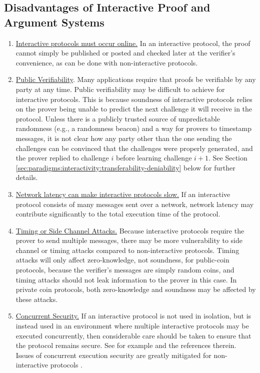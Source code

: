 \subsection{Disadvantages of Interactive Proof and Argument Systems}
\label{sec:paradigms:interactivity:disadvantages}
\begin{enumerate}

\item \underline{Interactive protocols must occur online.} In an interactive protocol, the proof cannot simply be published or posted and checked later at the verifier's convenience, as can be done with non-interactive protocols.

\item \underline{Public Verifiability}. Many applications require that proofs be verifiable by any party at any time. 
Public verifiability
may be difficult to achieve for interactive protocols. This is because soundness of interactive 
protocols relies on the prover being unable to predict the next challenge it will receive in the protocol. Unless there is a publicly trusted source of unpredictable
randomness (e.g., a randomness beacon) and a way for provers to timestamp messages, it is not clear how any party other than
the one sending the challenges can be convinced that the challenges were properly generated, and the prover replied to challenge $i$ before learning challenge $i+1$.
See Section \ref{sec:paradigms:interactivity:transferability-deniability} below for further details.

\item \underline{Network latency can make interactive protocols slow.} If an interactive protocol consists of many messages sent over a network,
network latency may contribute significantly to the total execution time of the protocol.

\item \underline{Timing or Side Channel Attacks.} Because interactive protocols require the prover to send multiple messages, there may be more vulnerability to side channel or timing attacks compared to non-interactive protocols. Timing attacks will only affect zero-knowledge, not soundness, for public-coin protocols, because the verifier's messages are simply random coins, and timing attacks should not leak information to the prover in this case. In private coin protocols, both zero-knowledge and soundness may be affected by these attacks.

\item \underline{Concurrent Security.}  If an interactive protocol is not used in isolation, but is instead used in an environment where multiple interactive
protocols may be executed concurrently, then considerable care should be taken to ensure that the protocol remains secure. 
 See for example \cite[Section 2.1]{2013:CISS:a-short-tutorial-on-zero-knowledge}
and the references therein. Issues of concurrent execution security
are greatly mitigated for non-interactive protocols \cite{2006:eurocrypt:perfect-NIZK-for-NP}. 


\end{enumerate}
